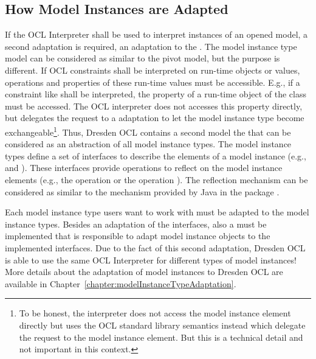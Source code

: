 \subsection{How Model Instances are Adapted}
\label{architecture:modelInstanceAdaptation}

If the OCL Interpreter shall be used to interpret instances of an opened 
model, a second adaptation is required, an adaptation to the . The model instance type model can be considered as similar
to the pivot model, but the purpose is different. If OCL constraints shall
be interpreted on run-time objects or values, operations and properties of these
run-time values must be accessible. E.g., if a constraint like  shall be interpreted, the property  of a
run-time object of the class  must be accessed. The OCL 
interpreter does not accesses this property directly, but delegates the request 
to a  adaptation to let the model instance type
become exchangeable\footnote{To be honest, the interpreter does not access the
model instance element directly but uses the OCL standard library semantics
instead which delegate the request to the model instance element. But this is a
technical detail and not important in this context.}. Thus, Dresden OCL
contains a second model the  that can be
considered as an abstraction of all model instance types. The model instance
types define a set of interfaces to describe the elements of a model instance
(e.g.,  and ).
These interfaces provide operations to reflect on the model instance elements
(e.g., the operation  or the
operation ). The reflection mechanism
can be considered as similar to the mechanism provided by Java in the package 
.

Each model instance type users want to work with must be adapted to the model 
instance types. Besides an adaptation of the interfaces, also a 
 must be implemented that is responsible to adapt 
model instance objects to the implemented interfaces. Due to the fact of this 
second adaptation, Dresden OCL is able to use the same OCL Interpreter for
different types of model instances! More details about the adaptation of model 
instances to Dresden OCL are available in 
Chapter~\ref{chapter:modelInstanceTypeAdaptation}.



